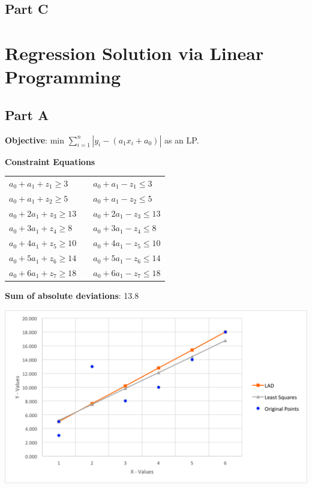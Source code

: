 \documentclass[11pt,letterpaper]{article}
\begin{document}
\subsection*{Part C}


\section{Regression Solution via Linear Programming}
\subsection*{Part A}
\textbf{Objective}: min $\sum\limits_{i=1}^n |y_i -  (a_1x_i + a_0)|$ as an LP.\vspace{8pt}

\textbf{Constraint Equations}

\begin{tabular}{l l l}
$a_0+a_1+z_1\geq3$	&  & $a_0+a_1-z_1\leq3$\\
$a_0+a_1+z_2\geq5$ 	& & $a_0+a_1-z_2\leq5$\\
$a_0+2a_1+z_3\geq13$	& & $a_0+2a_1-z_3\leq13$\\
$a_0+3a_1+z_4\geq8$	& & $a_0+3a_1-z_4\leq8$\\
$a_0+4a_1+z_5\geq10$	& & $a_0+4a_1-z_5\leq10$\\
$a_0+5a_1+z_6\geq14$	& & $a_0+5a_1-z_6\leq14$\\
$a_0+6a_1+z_7\geq18$	& & $a_0+6a_1-z_7\leq18$\\
\end{tabular}\vspace{8pt}


\textbf{Sum of absolute deviations}: 13.8\vspace{8pt}


\centerline{\includegraphics[width=7in]{lad.png}}
\end{document}
